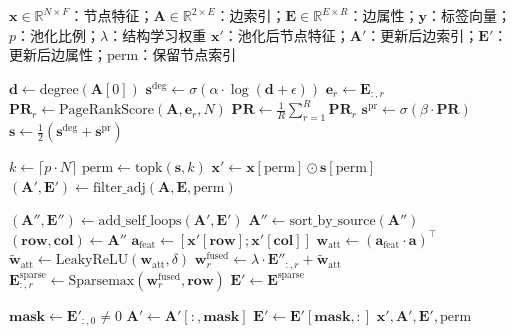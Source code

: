 \begin{algorithm}
  \centering
  \caption{LGMVPool：多视图图池化层}
  \label{alg:lgmvpool}
  \small
  \begin{algorithmic}[1]
  \REQUIRE $\mathbf{x} \in \mathbb{R}^{N \times F}$：节点特征；$\mathbf{A} \in \mathbb{R}^{2 \times E}$：边索引；$\mathbf{E} \in \mathbb{R}^{E \times R}$：边属性；$\mathbf{y}$：标签向量；$p$：池化比例；$\lambda$：结构学习权重
  \ENSURE $\mathbf{x}'$：池化后节点特征；$\mathbf{A}'$：更新后边索引；$\mathbf{E}'$：更新后边属性；$\text{perm}$：保留节点索引

  \STATE {}
  \STATE $\mathbf{d} \leftarrow \text{degree}(\mathbf{A}[0])$
  \STATE $\mathbf{s}^{\text{deg}} \leftarrow \sigma(\alpha \cdot \log(\mathbf{d} + \epsilon))$
  \STATE {}
    \STATE $\mathbf{e}_r \leftarrow \mathbf{E}_{:, r}$
    \STATE $\mathbf{PR}_r \leftarrow \text{PageRankScore}(\mathbf{A}, \mathbf{e}_r, N)$
  \ENDFOR
  \STATE $\mathbf{PR} \leftarrow \frac{1}{R} \sum_{r=1}^{R} \mathbf{PR}_r$
  \STATE $\mathbf{s}^{\text{pr}} \leftarrow \sigma(\beta \cdot \mathbf{PR})$
  \STATE $\mathbf{s} \leftarrow \frac{1}{2}(\mathbf{s}^{\text{deg}} + \mathbf{s}^{\text{pr}})$

  \STATE {}
  \STATE $k \leftarrow \lceil p \cdot N \rceil$
  \STATE $\text{perm} \leftarrow \text{topk}(\mathbf{s}, k)$
  \STATE $\mathbf{x}' \leftarrow \mathbf{x}[\text{perm}] \odot \mathbf{s}[\text{perm}]$
  \STATE $(\mathbf{A}', \mathbf{E}') \leftarrow \text{filter\_adj}(\mathbf{A}, \mathbf{E}, \text{perm})$

  \STATE {}
  \STATE $(\mathbf{A}'', \mathbf{E}'') \leftarrow \text{add\_self\_loops}(\mathbf{A}', \mathbf{E}')$
  \STATE $\mathbf{A}'' \leftarrow \text{sort\_by\_source}(\mathbf{A}'')$
  \STATE $(\mathbf{row}, \mathbf{col}) \leftarrow \mathbf{A}''$
  \STATE $\mathbf{a}_{\text{feat}} \leftarrow [\mathbf{x}'[\mathbf{row}] ; \mathbf{x}'[\mathbf{col}]]$
  \STATE $\mathbf{w}_{\text{att}} \leftarrow (\mathbf{a}_{\text{feat}} \cdot \mathbf{a})^{\top}$
  \STATE $\tilde{\mathbf{w}}_{\text{att}} \leftarrow \text{LeakyReLU}(\mathbf{w}_{\text{att}}, \delta)$
  \STATE {}
    \STATE $\mathbf{w}_r^{\text{fused}} \leftarrow \lambda \cdot \mathbf{E}''_{:, r} + \tilde{\mathbf{w}}_{\text{att}}$
    \STATE $\mathbf{E}^{\text{sparse}}_{:, r} \leftarrow \text{Sparsemax}(\mathbf{w}_r^{\text{fused}}, \mathbf{row})$
  \ENDFOR
  \STATE $\mathbf{E}' \leftarrow \mathbf{E}^{\text{sparse}}$

  \STATE {}
  \STATE $\mathbf{mask} \leftarrow \mathbf{E}'_{:, 0} \neq 0$
  \STATE $\mathbf{A}' \leftarrow \mathbf{A}'[:, \mathbf{mask}]$
  \STATE $\mathbf{E}' \leftarrow \mathbf{E}'[\mathbf{mask}, :]$
  \RETURN $\mathbf{x}', \mathbf{A}', \mathbf{E}', \text{perm}$
  \end{algorithmic}
\end{algorithm}


